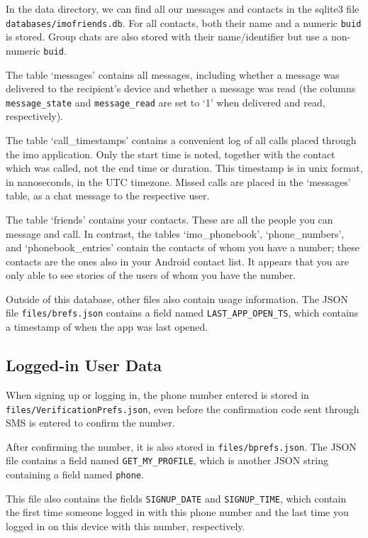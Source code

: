 \documentclass[conference]{IEEEtran}
\begin{document}
In the data directory, we can find all our messages and contacts in the sqlite3
file \texttt{databases/imofriends.db}. For all contacts, both their name and a
numeric \texttt{buid} is stored. Group chats are also stored with their
name/identifier but use a non-numeric \texttt{buid}.

The table `messages' contains all messages, including whether a message was
delivered to the recipient's device and whether a message was read (the columns
\texttt{message\_state} and \texttt{message\_read} are set to `1' when
delivered and read, respectively).

The table `call\_timestamps' contains a convenient log of all calls placed
through the imo application. Only the start time is noted, together with the
contact which was called, not the end time or duration. This timestamp is in
unix format, in nanoseconds, in the UTC timezone. Missed calls are placed in
the `messages' table, as a chat message to the respective user.

The table `friends' contains your contacts. These are all the people you can
message and call. In contrast, the tables `imo\_phonebook', `phone\_numbers',
and `phonebook\_entries' contain the contacts of whom you have a number; these
contacts are the ones also in your Android contact list. It appears that you
are only able to see stories of the users of whom you have the number.

Outside of this database, other files also contain usage information. The JSON
file \texttt{files/brefs.json} contains a field named
\texttt{LAST\_APP\_OPEN\_TS}, which contains a timestamp of when the app was
last opened.


\subsection{Logged-in User Data}

When signing up or logging in, the phone number entered is stored in
\texttt{files/VerificationPrefs.json}, even before the confirmation code sent
through SMS is entered to confirm the number.

After confirming the number, it is also stored in \texttt{files/bprefs.json}.
The JSON file contains a field named \texttt{GET\_MY\_PROFILE}, which is another
JSON string containing a field named \texttt{phone}.

This file also contains the fields \texttt{SIGNUP\_DATE} and
\texttt{SIGNUP\_TIME}, which contain the first time someone logged in with this
phone number and the last time you logged in on this device with this number,
respectively.
\end{document}
